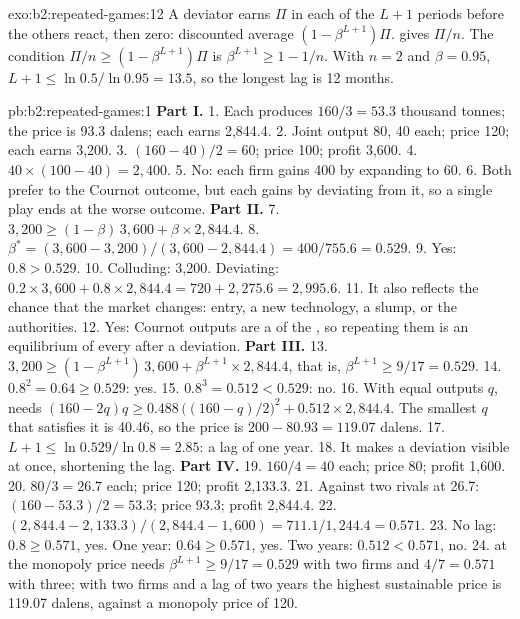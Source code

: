 \begin{solution}{exo:b2:repeated-games:12}
A deviator earns $\Pi$ in each of the $L + 1$ periods before the others react, then zero: discounted average $(1 -
\beta^{L+1})\Pi$.  gives $\Pi/n$. The condition $\Pi/n \ge (1 - \beta^{L+1})\Pi$ is $\beta^{L+1} \ge 1 - 1/n$. With $n = 2$ and $\beta = 0.95$,
$L + 1 \le \ln 0.5/\ln 0.95 = 13.5$, so the longest lag is 12 months.
\end{solution}

\begin{solution}{pb:b2:repeated-games:1}
\textbf{Part I.}
1. Each produces $160/3 = 53.3$ thousand tonnes; the price is 93.3 dalens; each earns 2{,}844.4.
2. Joint output 80, 40 each; price 120; each earns 3{,}200.
3. $(160 - 40)/2 = 60$; price 100; profit 3{,}600.
4. $40 \times (100 - 40) = 2{,}400$.
5. No: each firm gains 400 by expanding to 60.
6. Both prefer  to the Cournot outcome, but each gains by deviating from it, so a single play ends at the
worse outcome.
\textbf{Part II.}
7. $3{,}200 \ge (1 - \beta)\,3{,}600 + \beta \times 2{,}844.4$.
8. $\beta^* = (3{,}600 - 3{,}200)/(3{,}600 - 2{,}844.4) = 400/755.6 = 0.529$.
9. Yes: $0.8 > 0.529$.
10. Colluding: 3{,}200. Deviating: $0.2 \times 3{,}600 + 0.8 \times 2{,}844.4 = 720 + 2{,}275.6 = 2{,}995.6$.
11. It also reflects the chance that the market changes: entry, a new technology, a slump, or the authorities.
12. Yes: Cournot outputs are a  of the , so repeating them is an equilibrium of every
 after a deviation.
\textbf{Part III.}
13. $3{,}200 \ge (1 - \beta^{L+1})\,3{,}600 + \beta^{L+1} \times 2{,}844.4$, that is, $\beta^{L+1} \ge 9/17 = 0.529$.
14. $0.8^2 = 0.64 \ge 0.529$: yes.
15. $0.8^3 = 0.512 < 0.529$: no.
16. With equal outputs $q$,  needs $(160 - 2q)q \ge 0.488\,\big((160 - q)/2\big)^2 + 0.512 \times 2{,}844.4$. The smallest $q$ that
satisfies it is 40.46, so the price is $200 - 80.93 = 119.07$ dalens.
17. $L + 1 \le \ln 0.529/\ln 0.8 = 2.85$: a lag of one year.
18. It makes a deviation visible at once, shortening the lag.
\textbf{Part IV.}
19. $160/4 = 40$ each; price 80; profit 1{,}600.
20. $80/3 = 26.7$ each; price 120; profit 2{,}133.3.
21. Against two rivals at 26.7: $(160 - 53.3)/2 = 53.3$; price 93.3; profit 2{,}844.4.
22. $(2{,}844.4 - 2{,}133.3)/(2{,}844.4 - 1{,}600) = 711.1/1{,}244.4 = 0.571$.
23. No lag: $0.8 \ge 0.571$, yes. One year: $0.64 \ge 0.571$, yes. Two years: $0.512 < 0.571$, no.
24.  at the monopoly price needs $\beta^{L+1} \ge 9/17 = 0.529$ with two firms and $4/7 = 0.571$ with three; with two firms
and a lag of two years the highest sustainable price is 119.07 dalens, against a monopoly price of 120.
\end{solution}
